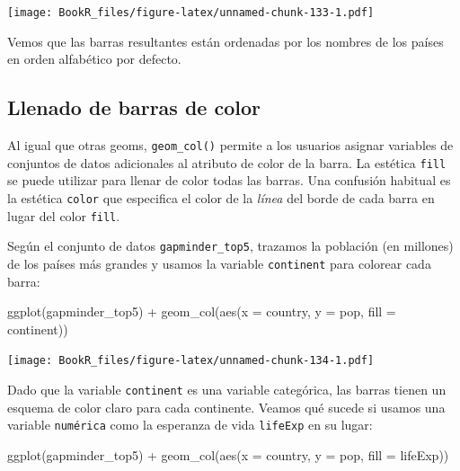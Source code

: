 \documentclass[
]{book}
\newenvironment{Shaded}{\begin{snugshade}}{\end{snugshade}}
\newcommand{\AttributeTok}[1]{\textcolor[rgb]{0.77,0.63,0.00}{#1}}
\newcommand{\FunctionTok}[1]{\textcolor[rgb]{0.00,0.00,0.00}{#1}}
\newcommand{\NormalTok}[1]{#1}
\newcommand{\SpecialCharTok}[1]{\textcolor[rgb]{0.00,0.00,0.00}{#1}}
\begin{document}
\texttt{[image: BookR\_files/figure-latex/unnamed-chunk-133-1.pdf]}

Vemos que las barras resultantes están ordenadas por los nombres de los países en orden alfabético por defecto.

\hypertarget{llenado-de-barras-de-color}{%
\subsection{Llenado de barras de color}\label{llenado-de-barras-de-color}}

Al igual que otras geoms, \texttt{geom\_col()} permite a los usuarios asignar variables de conjuntos de datos adicionales al atributo de color de la barra. La estética \texttt{fill} se puede utilizar para llenar de color todas las barras. Una confusión habitual es la estética \texttt{color} que especifica el color de la \emph{línea} del borde de cada barra en lugar del color \texttt{fill}.

Según el conjunto de datos \texttt{gapminder\_top5}, trazamos la población (en millones) de los países más grandes y usamos la variable \texttt{continent} para colorear cada barra:

\begin{Shaded}
\begin{Highlighting}[]
\FunctionTok{ggplot}\NormalTok{(gapminder\_top5) }\SpecialCharTok{+} 
  \FunctionTok{geom\_col}\NormalTok{(}\FunctionTok{aes}\NormalTok{(}\AttributeTok{x =}\NormalTok{ country, }\AttributeTok{y =}\NormalTok{ pop, }\AttributeTok{fill =}\NormalTok{ continent))}
\end{Highlighting}
\end{Shaded}

\texttt{[image: BookR\_files/figure-latex/unnamed-chunk-134-1.pdf]}

Dado que la variable \texttt{continent} es una variable categórica, las barras tienen un esquema de color claro para cada continente. Veamos qué sucede si usamos una variable \texttt{numérica} como la esperanza de vida \texttt{lifeExp} en su lugar:

\begin{Shaded}
\begin{Highlighting}[]
\FunctionTok{ggplot}\NormalTok{(gapminder\_top5) }\SpecialCharTok{+} 
  \FunctionTok{geom\_col}\NormalTok{(}\FunctionTok{aes}\NormalTok{(}\AttributeTok{x =}\NormalTok{ country, }\AttributeTok{y =}\NormalTok{ pop, }\AttributeTok{fill =}\NormalTok{ lifeExp))}
\end{Highlighting}
\end{Shaded}
\end{document}

